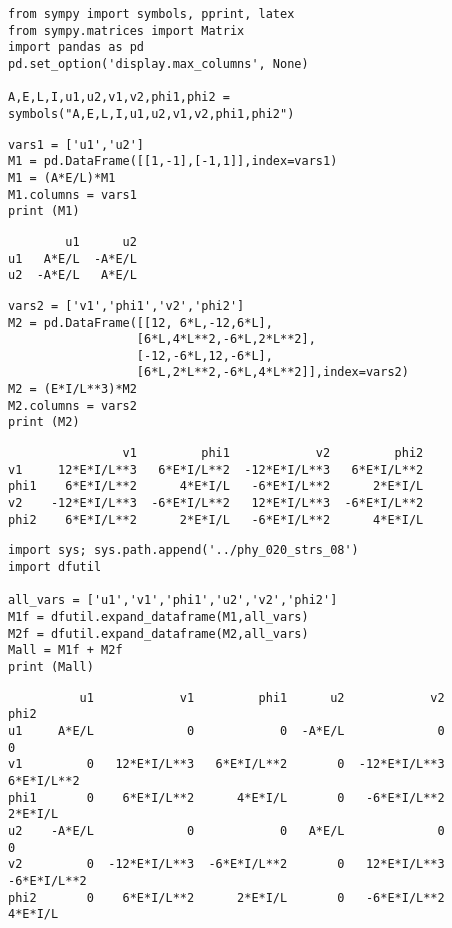 \documentclass[12pt,fleqn]{article}\usepackage{../../common}
\begin{document}

\begin{verbatim}
from sympy import symbols, pprint, latex
from sympy.matrices import Matrix
import pandas as pd
pd.set_option('display.max_columns', None)

A,E,L,I,u1,u2,v1,v2,phi1,phi2 = symbols("A,E,L,I,u1,u2,v1,v2,phi1,phi2")
\end{verbatim}

\begin{verbatim}
vars1 = ['u1','u2']
M1 = pd.DataFrame([[1,-1],[-1,1]],index=vars1)
M1 = (A*E/L)*M1
M1.columns = vars1
print (M1)
\end{verbatim}

\begin{verbatim}
        u1      u2
u1   A*E/L  -A*E/L
u2  -A*E/L   A*E/L
\end{verbatim}

\begin{verbatim}
vars2 = ['v1','phi1','v2','phi2']
M2 = pd.DataFrame([[12, 6*L,-12,6*L],
                  [6*L,4*L**2,-6*L,2*L**2],
                  [-12,-6*L,12,-6*L],
                  [6*L,2*L**2,-6*L,4*L**2]],index=vars2)
M2 = (E*I/L**3)*M2
M2.columns = vars2
print (M2)
\end{verbatim}

\begin{verbatim}
                v1         phi1            v2         phi2
v1     12*E*I/L**3   6*E*I/L**2  -12*E*I/L**3   6*E*I/L**2
phi1    6*E*I/L**2      4*E*I/L   -6*E*I/L**2      2*E*I/L
v2    -12*E*I/L**3  -6*E*I/L**2   12*E*I/L**3  -6*E*I/L**2
phi2    6*E*I/L**2      2*E*I/L   -6*E*I/L**2      4*E*I/L
\end{verbatim}

\begin{verbatim}
import sys; sys.path.append('../phy_020_strs_08')
import dfutil

all_vars = ['u1','v1','phi1','u2','v2','phi2']
M1f = dfutil.expand_dataframe(M1,all_vars)
M2f = dfutil.expand_dataframe(M2,all_vars)
Mall = M1f + M2f
print (Mall)
\end{verbatim}

\begin{verbatim}
          u1            v1         phi1      u2            v2         phi2
u1     A*E/L             0            0  -A*E/L             0            0
v1         0   12*E*I/L**3   6*E*I/L**2       0  -12*E*I/L**3   6*E*I/L**2
phi1       0    6*E*I/L**2      4*E*I/L       0   -6*E*I/L**2      2*E*I/L
u2    -A*E/L             0            0   A*E/L             0            0
v2         0  -12*E*I/L**3  -6*E*I/L**2       0   12*E*I/L**3  -6*E*I/L**2
phi2       0    6*E*I/L**2      2*E*I/L       0   -6*E*I/L**2      4*E*I/L
\end{verbatim}
\end{document}

